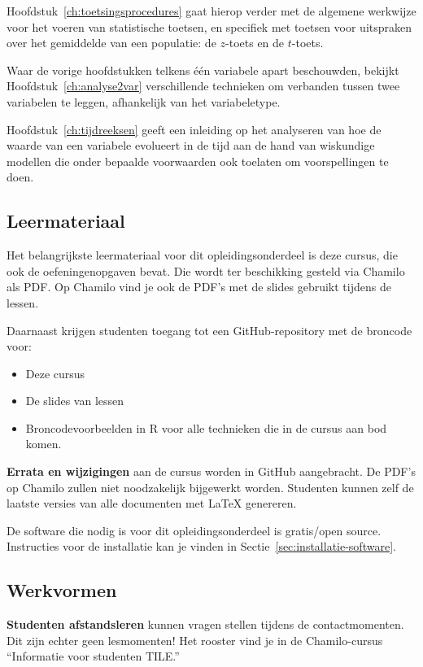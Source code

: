 Hoofdstuk~\ref{ch:toetsingsprocedures} gaat hierop verder met de algemene werkwijze voor het voeren van statistische toetsen, en specifiek met toetsen voor uitspraken over het gemiddelde van een populatie: de $z$-toets en de $t$-toets.

Waar de vorige hoofdstukken telkens één variabele apart beschouwden, bekijkt Hoofdstuk~\ref{ch:analyse2var} verschillende technieken om verbanden tussen twee variabelen te leggen, afhankelijk van het variabeletype.

Hoofdstuk~\ref{ch:tijdreeksen} geeft een inleiding op het analyseren van hoe de waarde van een variabele evolueert in de tijd aan de hand van wiskundige modellen die onder bepaalde voorwaarden ook toelaten om voorspellingen te doen.

\subsection{Leermateriaal}

Het belangrijkste leermateriaal voor dit opleidingsonderdeel is deze cursus, die ook de oefeningenopgaven bevat. Die wordt ter beschikking gesteld via Chamilo als PDF. Op Chamilo vind je ook de PDF's met de slides gebruikt tijdens de lessen.

Daarnaast krijgen studenten toegang tot een GitHub-repository met de broncode voor:

\begin{itemize}
  \item Deze cursus
  \item De slides van lessen
  \item Broncodevoorbeelden in R voor alle technieken die in de cursus aan bod komen.
\end{itemize}

\textbf{Errata en wijzigingen} aan de cursus worden in GitHub aangebracht. De PDF's op Chamilo zullen niet noodzakelijk bijgewerkt worden. Studenten kunnen zelf de laatste versies van alle documenten met \LaTeX{} genereren.

De software die nodig is voor dit opleidingsonderdeel is gratis/open source. Instructies voor de installatie kan je vinden in Sectie~\ref{sec:installatie-software}.

\subsection{Werkvormen}

\textbf{Studenten afstandsleren} kunnen vragen stellen tijdens de contactmomenten. Dit zijn echter geen lesmomenten! Het rooster vind je in de Chamilo-cursus ``Informatie voor studenten TILE.''

